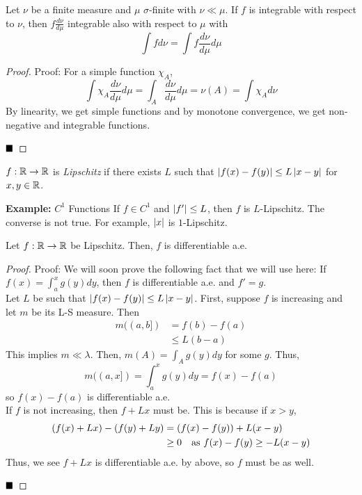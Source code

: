 \begin{lemma}
    Let $\nu$ be a finite measure and $\mu$ $\sigma$-finite with $\nu \ll \mu$. If $f$ is integrable with respect to $\nu$, then $f \frac{d\nu}{d\mu}$ integrable also with respect to $\mu$ with
    \[ \int f d\nu = \int f \frac{d\nu}{d\mu} d\mu \]
\end{lemma}
\begin{proof}{Proof:}
    For a simple function $\chi_A$,
    \[ \int \chi_A \frac{d\nu}{d\mu} d\mu = \int_{A} \frac{d\nu}{d\mu} d\mu = \nu(A) = \int \chi_A d\nu \]
    By linearity, we get simple functions and by monotone convergence, we get non-negative and integrable functions.

    $\qed$
\end{proof}

\begin{definition}
    $f : \R \to \R$ is \emph{Lipschitz} if there exists $L$ such that $\abs{f(x) - f(y)} \leq L\abs{x - y}$ for $x, y \in \R$.
\end{definition}

\begin{example}{\textbf{Example:} $C^1$ Functions}
    If $f \in C^1$ and $\abs{f'} \leq L$, then $f$ is $L$-Lipschitz. The converse is not true. For example, $\abs{x}$ is $1$-Lipschitz.
\end{example}

\begin{lemma}
    Let $f : \R \to \R$ be Lipschitz. Then, $f$ is differentiable a.e.
\end{lemma}
\begin{proof}{Proof:}
    We will soon prove the following fact that we will use here: If $f(x) = \int_{a}^{x} g(y) dy$, then $f$ is differentiable a.e. and $f' = g$.\\

    Let $L$ be such that $\abs{f(x) - f(y)} \leq L\abs{x - y}$. First, suppose $f$ is increasing and let $m$ be its L-S measure. Then
    \begin{align*}
        m((a, b]) &= f(b) - f(a)\\
        &\leq L(b - a)
    \end{align*}
    This implies $m \ll \lambda$. Then, $m(A) = \int_{A} g(y) dy$ for some $g$. Thus,
    \[ m((a, x]) = \int_{a}^{x} g(y) dy = f(x) - f(a) \]
    so $f(x) - f(a)$ is differentiable a.e.\\

    If $f$ is not increasing, then $f + Lx$ must be. This is because if $x > y$,
    \begin{align*}
        (f(x) + Lx) - (f(y) + Ly) &= (f(x) - f(y)) + L(x - y)\\
        &\geq 0 \quad \tt{as } f(x) - f(y) \geq -L(x - y)
    \end{align*}
    Thus, we see $f + Lx$ is differentiable a.e. by above, so $f$ must be as well.

    $\qed$
\end{proof}

